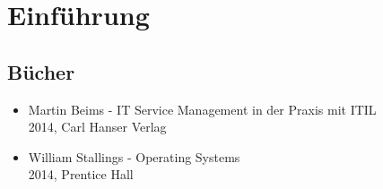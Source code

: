 \chapter{Einführung}
\section{Bücher}
\begin{itemize}
	\item Martin Beims - IT  Service Management in der Praxis mit ITIL \\
	2014, Carl Hanser Verlag
	\item William Stallings - Operating Systems\\
	2014, Prentice Hall
\end{itemize}